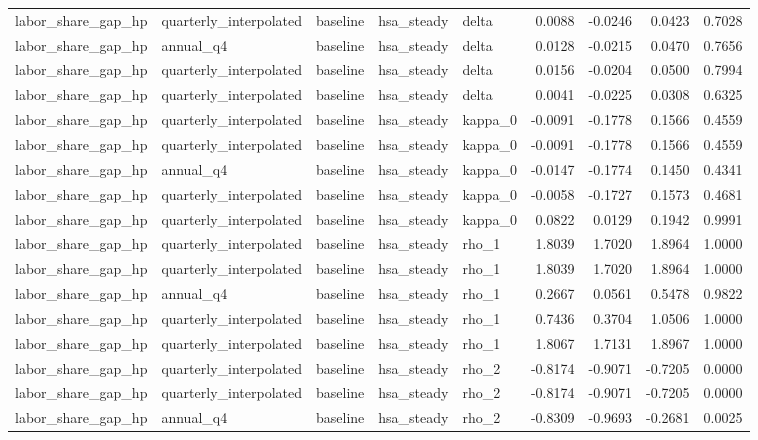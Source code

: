 \begin{tabular}{lllllrrrr}
labor\_share\_gap\_hp & quarterly\_interpolated & baseline & hsa\_steady & delta & 0.0088 & -0.0246 & 0.0423 & 0.7028 \\
labor\_share\_gap\_hp & annual\_q4 & baseline & hsa\_steady & delta & 0.0128 & -0.0215 & 0.0470 & 0.7656 \\
labor\_share\_gap\_hp & quarterly\_interpolated & baseline & hsa\_steady & delta & 0.0156 & -0.0204 & 0.0500 & 0.7994 \\
labor\_share\_gap\_hp & quarterly\_interpolated & baseline & hsa\_steady & delta & 0.0041 & -0.0225 & 0.0308 & 0.6325 \\
labor\_share\_gap\_hp & quarterly\_interpolated & baseline & hsa\_steady & kappa\_0 & -0.0091 & -0.1778 & 0.1566 & 0.4559 \\
labor\_share\_gap\_hp & quarterly\_interpolated & baseline & hsa\_steady & kappa\_0 & -0.0091 & -0.1778 & 0.1566 & 0.4559 \\
labor\_share\_gap\_hp & annual\_q4 & baseline & hsa\_steady & kappa\_0 & -0.0147 & -0.1774 & 0.1450 & 0.4341 \\
labor\_share\_gap\_hp & quarterly\_interpolated & baseline & hsa\_steady & kappa\_0 & -0.0058 & -0.1727 & 0.1573 & 0.4681 \\
labor\_share\_gap\_hp & quarterly\_interpolated & baseline & hsa\_steady & kappa\_0 & 0.0822 & 0.0129 & 0.1942 & 0.9991 \\
labor\_share\_gap\_hp & quarterly\_interpolated & baseline & hsa\_steady & rho\_1 & 1.8039 & 1.7020 & 1.8964 & 1.0000 \\
labor\_share\_gap\_hp & quarterly\_interpolated & baseline & hsa\_steady & rho\_1 & 1.8039 & 1.7020 & 1.8964 & 1.0000 \\
labor\_share\_gap\_hp & annual\_q4 & baseline & hsa\_steady & rho\_1 & 0.2667 & 0.0561 & 0.5478 & 0.9822 \\
labor\_share\_gap\_hp & quarterly\_interpolated & baseline & hsa\_steady & rho\_1 & 0.7436 & 0.3704 & 1.0506 & 1.0000 \\
labor\_share\_gap\_hp & quarterly\_interpolated & baseline & hsa\_steady & rho\_1 & 1.8067 & 1.7131 & 1.8967 & 1.0000 \\
labor\_share\_gap\_hp & quarterly\_interpolated & baseline & hsa\_steady & rho\_2 & -0.8174 & -0.9071 & -0.7205 & 0.0000 \\
labor\_share\_gap\_hp & quarterly\_interpolated & baseline & hsa\_steady & rho\_2 & -0.8174 & -0.9071 & -0.7205 & 0.0000 \\
labor\_share\_gap\_hp & annual\_q4 & baseline & hsa\_steady & rho\_2 & -0.8309 & -0.9693 & -0.2681 & 0.0025 \\

\end{tabular}
